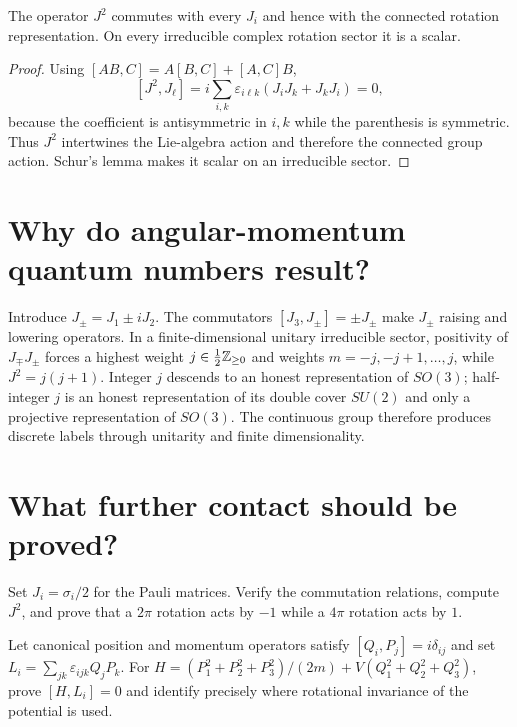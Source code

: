 \begin{theorem}
The operator $J^2$ commutes with every $J_i$ and hence with the connected
rotation representation.  On every irreducible complex rotation sector it is
a scalar.
\end{theorem}

\begin{proof}
Using $[AB,C]=A[B,C]+[A,C]B$,
\[
[J^2,J_\ell]
=i\sum_{i,k}\varepsilon_{i\ell k}(J_iJ_k+J_kJ_i)=0,
\]
because the coefficient is antisymmetric in $i,k$ while the parenthesis is
symmetric.  Thus $J^2$ intertwines the Lie-algebra action and therefore the
connected group action.  Schur's lemma makes it scalar on an irreducible
sector.
\end{proof}

\section{Why do angular-momentum quantum numbers result?}

Introduce $J_\pm=J_1\pm iJ_2$.  The commutators
$[J_3,J_\pm]=\pm J_\pm$ make $J_\pm$ raising and lowering operators.  In a
finite-dimensional unitary irreducible sector, positivity of
$J_\mp J_\pm$ forces a highest weight $j\in\tfrac12\mathbb Z_{\ge0}$ and weights
$m=-j,-j+1,\ldots,j$, while $J^2=j(j+1)$.  Integer $j$ descends to an honest
representation of $SO(3)$; half-integer $j$ is an honest representation of
its double cover $SU(2)$ and only a projective representation of $SO(3)$.
The continuous group therefore produces discrete labels through unitarity and
finite dimensionality.

\section{What further contact should be proved?}

\begin{exercise}
Set $J_i=\sigma_i/2$ for the Pauli matrices.  Verify the commutation
relations, compute $J^2$, and prove that a $2\pi$ rotation acts by $-1$ while
a $4\pi$ rotation acts by $1$.
\end{exercise}

\begin{exercise}
Let canonical position and momentum operators satisfy
$[Q_i,P_j]=i\delta_{ij}$ and set
$L_i=\sum_{jk}\varepsilon_{ijk}Q_jP_k$.  For
$H=(P_1^2+P_2^2+P_3^2)/(2m)+V(Q_1^2+Q_2^2+Q_3^2)$, prove
$[H,L_i]=0$ and identify precisely where rotational invariance of the
potential is used.
\end{exercise}


